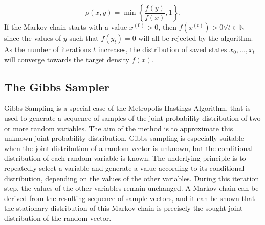 \documentclass[12pt]{book}
\begin{document}
\begin{equation*}
     \rho\left(x,y\right) = \min\left\lbrace\frac{f\left(y\right)}{f\left(x\right)}, 1\right\rbrace.
\end{equation*}
If the Markov chain starts with a value $x^{(0)} > 0$, then $f\left(x^{(t)}\right) > 0 \forall t\in\mathbb{N}$ since the values of $y$ such that $f\left(y_t\right) = 0$ will all be rejected by the algorithm. As the number of iterations $t$ increases, the distribution of saved states $x_0,...,x_t$ will converge towards the target density $f(x)$.  \autocite[Cf.][]{robert2013monte}
\subsection{The Gibbs Sampler}
Gibbs-Sampling is a special case of the Metropolis-Hastings Algorithm, that is used to generate a sequence of samples of the joint probability distribution of two or more random variables. The aim of the method is to approximate this unknown joint probability distribution. Gibbs sampling is especially suitable when the joint distribution of a random vector is unknown, but the conditional distribution of each random variable is known. The underlying principle is to repeatedly select a variable and generate a value according to its conditional distribution, depending on the values of the other variables. During this iteration step, the values of the other variables remain unchanged. A Markov chain can be derived from the resulting sequence of sample vectors, and it can be shown that the stationary distribution of this Markov chain is precisely the sought joint distribution of the random vector.
\end{document}
